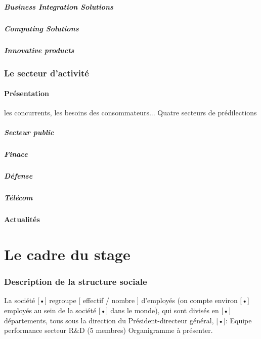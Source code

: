 \documentclass{article}
\begin{document}
			\subsubsection{Business Integration Solutions}
			\subsubsection{Computing Solutions}
			\subsubsection{Innovative products}
	\section{Le secteur d'activité}
		\subsection{Présentation}
			les concurrents, les besoins des consommateurs...
			Quatre secteurs de prédilections
			\subsubsection{Secteur public}
			\subsubsection{Finace}
			\subsubsection{Défense}
			\subsubsection{Télécom}
		\subsection{Actualités}


\newpage
{}
\part{Le cadre du stage}
	\section{Description de la structure sociale}
		La société [•] regroupe [ effectif / nombre ] d’employés (on compte environ [•] employés au sein de la société [•] 
		dans le monde), qui sont divisés en [•] départements, tous sous la direction du Président-directeur général, [•]: 
		Equipe performance secteur R\&D (5 membres)
		Organigramme à présenter.
\end{document}
